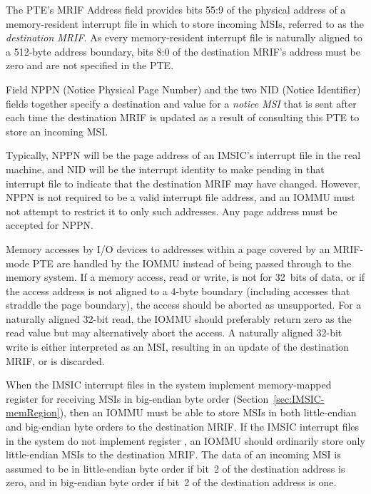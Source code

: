 The PTE's MRIF Address field provides bits 55:9 of the physical address
of a memory-resident interrupt file in which to store incoming MSIs,
referred to as the \emph{destination MRIF}.
As every memory-resident interrupt file is naturally aligned to a
\mbox{512-byte} address boundary, bits 8:0 of the destination MRIF's
address must be zero and are not specified in the PTE.

Field NPPN (Notice Physical Page Number) and the two NID
(Notice Identifier) fields together specify a destination and value for
a \emph{notice MSI} that is sent after each time the destination MRIF
is updated as a result of consulting this PTE to store an incoming MSI.

\begin{commentary}
Typically, NPPN will be the page address of an IMSIC's interrupt file
in the real machine, and NID will be the interrupt identity to make
pending in that interrupt file to indicate that the destination MRIF
may have changed.
However, NPPN is not required to be a valid interrupt file address, and
an \mbox{IOMMU} must not attempt to restrict it to only such addresses.
Any page address must be accepted for NPPN.
\end{commentary}

Memory accesses by I/O devices to addresses within a page
covered by an MRIF-mode PTE are handled by the IOMMU
instead of being passed through to the memory system.
If a memory access, read or write, is not for 32~bits of data,
or if the access address is not aligned to a 4-byte boundary
(including accesses that straddle the page boundary),
the access should be aborted as unsupported.
For a naturally aligned 32-bit read, the IOMMU should preferably
return zero as the read value but may alternatively abort the access.
A naturally aligned 32-bit write is either interpreted as an MSI, resulting
in an update of the destination MRIF, or is discarded.

When the IMSIC interrupt files in the system implement memory-mapped
register  for receiving MSIs in big-endian byte order
(Section~\ref{sec:IMSIC-memRegion}), then an \mbox{IOMMU} must be able to
store MSIs in both little-endian and big-endian byte orders to the
destination MRIF.
If the IMSIC interrupt files in the system do not implement
register , an \mbox{IOMMU} should ordinarily store only
little-endian MSIs to the destination MRIF.
The data of an incoming MSI is assumed to be in little-endian byte
order if bit~2 of the destination address is zero, and in big-endian
byte order if bit~2 of the destination address is one.

